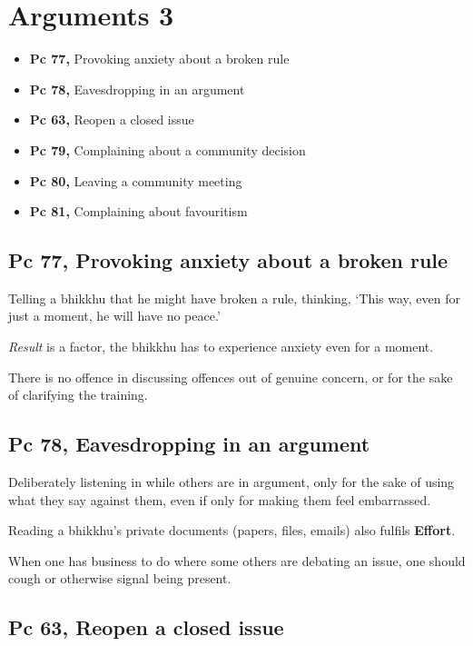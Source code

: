 \chapter{Arguments 3}

\begin{itemize}
\tightlist
\item
  \textbf{Pc 77,} Provoking anxiety about a broken rule
\item
  \textbf{Pc 78,} Eavesdropping in an argument
\item
  \textbf{Pc 63,} Reopen a closed issue
\item
  \textbf{Pc 79,} Complaining about a community decision
\item
  \textbf{Pc 80,} Leaving a community meeting
\item
  \textbf{Pc 81,} Complaining about favouritism
\end{itemize}

\section{Pc 77, Provoking anxiety about a broken rule}

Telling a bhikkhu that he might have broken a rule, thinking, `This way,
even for just a moment, he will have no peace.'

\emph{Result} is a factor, the bhikkhu has to experience anxiety even
for a moment.

There is no offence in discussing offences out of genuine concern, or
for the sake of clarifying the training.

\section{Pc 78, Eavesdropping in an argument}

Deliberately listening in while others are in argument, only for the
sake of using what they say against them, even if only for making them
feel embarrassed.

Reading a bhikkhu's private documents (papers, files, emails) also
fulfils \textbf{Effort}.

When one has business to do where some others are debating an issue, one
should cough or otherwise signal being present.

\section{Pc 63, Reopen a closed issue}

